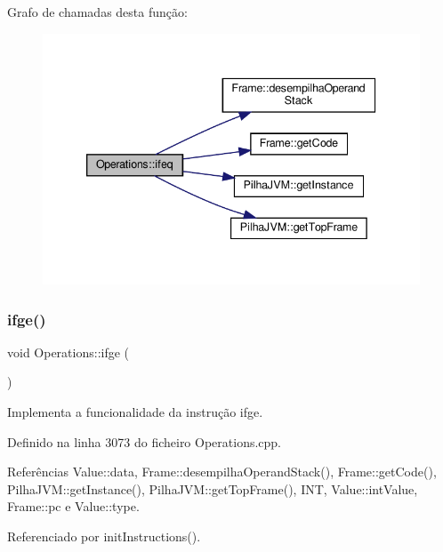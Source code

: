 Grafo de chamadas desta função\+:
\nopagebreak
\begin{figure}[H]
\begin{center}
\leavevmode
\includegraphics[width=339pt]{classOperations_ad33c8bdb5f67bdbf0885bb51990f99ee_cgraph}
\end{center}
\end{figure}
\mbox{\label{classOperations_a0e7cf2111ad25ee52aa329cc6ec4d38a}} 
\subsubsection{\texorpdfstring{ifge()}{ifge()}}
{\footnotesize\ttfamily void Operations\+::ifge (\begin{DoxyParamCaption}{ }\end{DoxyParamCaption})\hspace{0.3cm}{\ttfamily [private]}}



Implementa a funcionalidade da instrução ifge. 



Definido na linha 3073 do ficheiro Operations.\+cpp.



Referências Value\+::data, Frame\+::desempilha\+Operand\+Stack(), Frame\+::get\+Code(), Pilha\+J\+V\+M\+::get\+Instance(), Pilha\+J\+V\+M\+::get\+Top\+Frame(), I\+NT, Value\+::int\+Value, Frame\+::pc e Value\+::type.



Referenciado por init\+Instructions().

